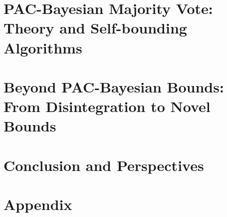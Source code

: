 \documentclass{thesis}
\begin{document}




\part[PAC-Bayesian Majority Vote:\\ Theory and Self-bounding Algorithms]{PAC-Bayesian Majority Vote:\\ {\LARGE Theory and Self-bounding Algorithms}}
\label{part:contrib-pac-bayes}






\part[Beyond PAC-Bayesian Bounds:\\ From Disintegration to Novel Bounds]{Beyond PAC-Bayesian Bounds:\\ {\LARGE From Disintegration to Novel Bounds}
}
\label{part:contrib-disintegrated}





\part{Conclusion and Perspectives}
\label{part:conclusion}




\appendix
\part{Appendix}










\newrefcontext[sorting=nyt]
\printbibliography[filter={references}, title={References}]


\newpage
\pagestyle{empty}
\strictpagecheck
\checkoddpage
\ifoddpage
~\newpage
\fi

\end{document}
